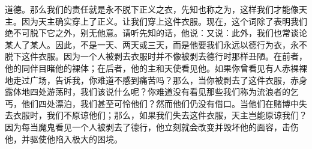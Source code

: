 道德。那么我们的责任就是永不脱下正义之衣，先知也称之为，这样我们才能像天主。因为天主确实穿上了正义。让我们穿上这件衣服。现在，这个词除了表明我们绝不可脱下它之外，别无他意。请听先知的话，他说：又说：此外，我们也常谈论某人了某人。因此，不是一天、两天或三天，而是他要我们永远以德行为衣，永不脱下这件衣服。因为一个人被剥去衣服时并不像被剥去德行时那样丑陋。在前者，他的同伴目睹他的裸体；在后者，他的主和天使看见他。如果你曾看见有人赤裸裸地走过广场，告诉我，你难道不感到痛苦吗？那么，当你被剥去了这件衣服，赤身露体地四处游荡时，我们该说什么呢？你难道没有看见那些我们称为流浪者的乞丐，他们四处漂泊，我们甚至可怜他们？然而他们仍没有借口。当他们在赌博中失去衣服时，我们不原谅他们；那么，如果我们失去这件衣服，天主岂能原谅我们？因为每当魔鬼看见一个人被剥去了德行，他立刻就会改变并毁坏他的面容，击伤他，并驱使他陷入极大的困境。\par

